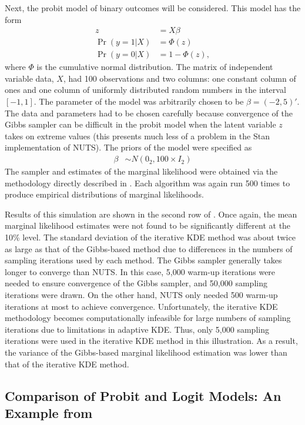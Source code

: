 \documentclass[twocolumn]{article}
\begin{document}
Next, the probit model of binary outcomes will be considered. This model has the form
\begin{subequations}
\begin{align}
	z &= X\beta \\
	\Pr(y=1|X) &= \Phi(z) \\
	\Pr(y=0|X) &= 1 - \Phi(z),
\end{align}
\end{subequations}
where $\Phi$ is the cumulative normal distribution. The matrix of independent variable data, $X$, had 100 observations and two columns: one constant column of ones and one column of uniformly distributed random numbers in the interval $[-1, 1]$. The parameter of the model was arbitrarily chosen to be $\beta = (-2, 5)'$. The data and parameters had to be chosen carefully because convergence of the Gibbs sampler can be difficult in the probit model when the latent variable $z$ takes on extreme values (this presents much less of a problem in the Stan implementation of NUTS). The priors of the model were specified as
\begin{align}
	\beta &\sim N(0_2, 100 \times I_2)
\end{align}
The sampler and estimates of the marginal likelihood were obtained via the methodology directly described in \cite{Chib}. Each algorithm was again run 500 times to produce empirical distributions of marginal likelihoods.

Results of this simulation are shown in the second row of . Once again, the mean marginal likelihood estimates were not found to be significantly different at the 10\% level. The standard deviation of the iterative KDE method was about twice as large as that of the Gibbs-based method due to differences in the numbers of sampling iterations used by each method. The Gibbs sampler generally takes longer to converge than NUTS. In this case, 5,000 warm-up iterations were needed to ensure convergence of the Gibbs sampler, and 50,000 sampling iterations were drawn. On the other hand, NUTS only needed 500 warm-up iterations at most to achieve convergence. Unfortunately, the iterative KDE methodology becomes computationally infeasible for large numbers of sampling iterations due to limitations in adaptive KDE. Thus, only 5,000 sampling iterations were used in the iterative KDE method in this illustration. As a result, the variance of the Gibbs-based marginal likelihood estimation was lower than that of the iterative KDE method.

\subsection{Comparison of Probit and Logit Models: An Example from \cite{Chib}}
\end{document}
